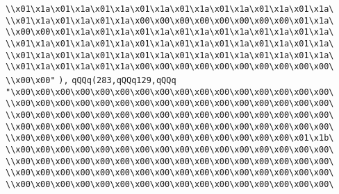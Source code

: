 \verb|\\x01\x1a\x01\x1a\x01\x1a\x01\x1a\x01\x1a\x01\x1a\x01\x1a\x01\x1a\|\newline
\verb|\\x01\x1a\x01\x1a\x01\x1a\x00\x00\x00\x00\x00\x00\x00\x00\x01\x1a\|\newline
\verb|\\x00\x00\x01\x1a\x01\x1a\x01\x1a\x01\x1a\x01\x1a\x01\x1a\x01\x1a\|\newline
\verb|\\x01\x1a\x01\x1a\x01\x1a\x01\x1a\x01\x1a\x01\x1a\x01\x1a\x01\x1a\|\newline
\verb|\\x01\x1a\x01\x1a\x01\x1a\x01\x1a\x01\x1a\x01\x1a\x01\x1a\x01\x1a\|\newline
\verb|\\x01\x1a\x01\x1a\x01\x1a\x00\x00\x00\x00\x00\x00\x00\x00\x00\x00\|\newline
\verb|\\x00\x00"|\newline
\verb|),|\newline
\verb|qQQq(283,qQQq129,qQQq|\newline
\verb|"\x00\x00\x00\x00\x00\x00\x00\x00\x00\x00\x00\x00\x00\x00\x00\x00\|\newline
\verb|\\x00\x00\x00\x00\x00\x00\x00\x00\x00\x00\x00\x00\x00\x00\x00\x00\|\newline
\verb|\\x00\x00\x00\x00\x00\x00\x00\x00\x00\x00\x00\x00\x00\x00\x00\x00\|\newline
\verb|\\x00\x00\x00\x00\x00\x00\x00\x00\x00\x00\x00\x00\x00\x00\x00\x00\|\newline
\verb|\\x00\x00\x00\x00\x00\x00\x00\x00\x00\x00\x00\x00\x00\x00\x01\x1b\|\newline
\verb|\\x00\x00\x00\x00\x00\x00\x00\x00\x00\x00\x00\x00\x00\x00\x00\x00\|\newline
\verb|\\x00\x00\x00\x00\x00\x00\x00\x00\x00\x00\x00\x00\x00\x00\x00\x00\|\newline
\verb|\\x00\x00\x00\x00\x00\x00\x00\x00\x00\x00\x00\x00\x00\x00\x00\x00\|\newline
\verb|\\x00\x00\x00\x00\x00\x00\x00\x00\x00\x00\x00\x00\x00\x00\x00\x00\|\newline
